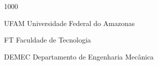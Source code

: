 \begin{listofabbrv}{1000}
\item [UFAM] Universidade Federal do Amazonas
\item [FT] Faculdade de Tecnologia
\item [DEMEC] Departamento de Engenharia Mecânica
\end{listofabbrv}

\setlength\extrarowheight{1pt}